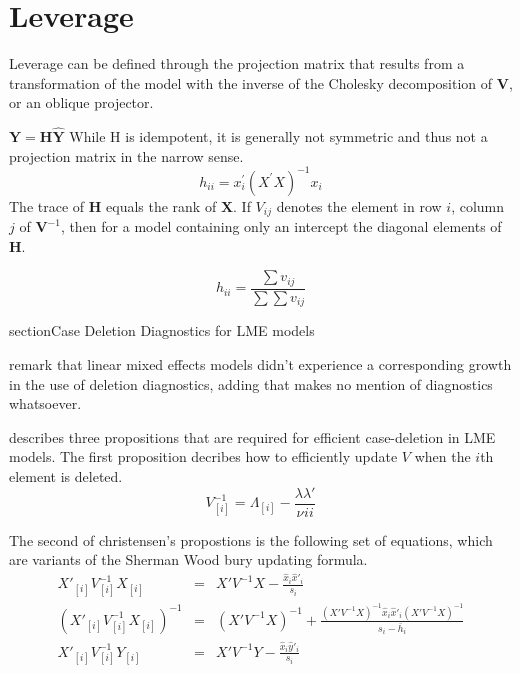 \documentclass[12pt, a4paper]{report}
\theoremstyle{plain}
\theoremstyle{definition}
\theoremstyle{remark}
\begin{document}
%	
%	

\section{Leverage}

Leverage can be defined through the projection matrix that results from a transformation of the model with the inverse of the Cholesky decomposition of $\boldsymbol{V}$, or an oblique projector.

$\boldsymbol{Y} = \boldsymbol{H}\boldsymbol{\hat{Y}}$
While H is idempotent, it is generally not symmetric and thus not a projection matrix in the narrow sense.
\[ h_{ii} = x^{\prime}_{i}(X^{\prime}X)^{-1}x_{i} \]
The trace of $\boldsymbol{H}$ equals the rank of $\boldsymbol{X}$.
If $V_{ij}$ denotes the element in row $i$, column $j$ of $\boldsymbol{V}^{-1}$, then for a model containing only an intercept the diagonal elements of $\boldsymbol{H}$.

\[ h_{ii} = \frac{\sum v_{ij}}{\sum \sum v_{ij}} \]




section{Case Deletion Diagnostics for LME models}

\citet{HaslettDillane} remark that linear mixed effects models
didn't experience a corresponding growth in the use of deletion
diagnostics, adding that \citet{McCullSearle} makes no mention of
diagnostics whatsoever.

\citet{Christensen} describes three propositions that are required
for efficient case-deletion in LME models. The first proposition
decribes how to efficiently update $V$ when the $i$th element is
deleted.
\begin{equation}
	V_{[i]}^{-1} = \Lambda_{[i]} - \frac{\lambda
		\lambda\prime}{\nu^{}ii}
\end{equation}


The second of christensen's propostions is the following set of
equations, which are variants of the Sherman Wood bury updating
formula.
\begin{eqnarray}
	X'_{[i]}V_{[i]}^{-1}X_{[i]} &=& X' V^{-1}X -
	\frac{\hat{x}_{i}\hat{x}'_{i}}{s_{i}}\\
	(X'_{[i]}V_{[i]}^{-1}X_{[i]})^{-1} &=& (X' V^{-1}X)^{-1} +
	\frac{(X' V^{-1}X)^{-1}\hat{x}_{i}\hat{x}' _{i}
		(X' V^{-1}X)^{-1}}{s_{i}- \bar{h}_{i}}\\
	X'_{[i]}V_{[i]}^{-1}Y_{[i]} &=& X\prime V^{-1}Y -
	\frac{\hat{x}_{i}\hat{y}' _{i}}{s_{i}}
\end{eqnarray}
\end{document}
